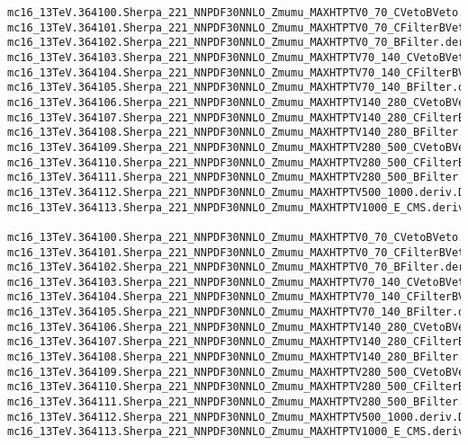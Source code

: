 \begin{tiny}
\begin{verbatim}
mc16_13TeV.364100.Sherpa_221_NNPDF30NNLO_Zmumu_MAXHTPTV0_70_CVetoBVeto.deriv.DAOD_STDM7.e5271_s3126_r9364_p4357
mc16_13TeV.364101.Sherpa_221_NNPDF30NNLO_Zmumu_MAXHTPTV0_70_CFilterBVeto.deriv.DAOD_STDM7.e5271_s3126_r9364_p4357
mc16_13TeV.364102.Sherpa_221_NNPDF30NNLO_Zmumu_MAXHTPTV0_70_BFilter.deriv.DAOD_STDM7.e5271_s3126_r9364_p4357
mc16_13TeV.364103.Sherpa_221_NNPDF30NNLO_Zmumu_MAXHTPTV70_140_CVetoBVeto.deriv.DAOD_STDM7.e5271_s3126_r9364_p4357
mc16_13TeV.364104.Sherpa_221_NNPDF30NNLO_Zmumu_MAXHTPTV70_140_CFilterBVeto.deriv.DAOD_STDM7.e5271_s3126_r9364_p4357
mc16_13TeV.364105.Sherpa_221_NNPDF30NNLO_Zmumu_MAXHTPTV70_140_BFilter.deriv.DAOD_STDM7.e5271_s3126_r9364_p4357
mc16_13TeV.364106.Sherpa_221_NNPDF30NNLO_Zmumu_MAXHTPTV140_280_CVetoBVeto.deriv.DAOD_STDM7.e5271_s3126_r9364_p4357
mc16_13TeV.364107.Sherpa_221_NNPDF30NNLO_Zmumu_MAXHTPTV140_280_CFilterBVeto.deriv.DAOD_STDM7.e5271_s3126_r9364_p4357
mc16_13TeV.364108.Sherpa_221_NNPDF30NNLO_Zmumu_MAXHTPTV140_280_BFilter.deriv.DAOD_STDM7.e5271_s3126_r9364_p4357
mc16_13TeV.364109.Sherpa_221_NNPDF30NNLO_Zmumu_MAXHTPTV280_500_CVetoBVeto.deriv.DAOD_STDM7.e5271_s3126_r9364_p4357
mc16_13TeV.364110.Sherpa_221_NNPDF30NNLO_Zmumu_MAXHTPTV280_500_CFilterBVeto.deriv.DAOD_STDM7.e5271_s3126_r9364_p4357
mc16_13TeV.364111.Sherpa_221_NNPDF30NNLO_Zmumu_MAXHTPTV280_500_BFilter.deriv.DAOD_STDM7.e5271_s3126_r9364_p4357
mc16_13TeV.364112.Sherpa_221_NNPDF30NNLO_Zmumu_MAXHTPTV500_1000.deriv.DAOD_STDM7.e5271_s3126_r9364_p4357
mc16_13TeV.364113.Sherpa_221_NNPDF30NNLO_Zmumu_MAXHTPTV1000_E_CMS.deriv.DAOD_STDM7.e5271_s3126_r9364_p4357

mc16_13TeV.364100.Sherpa_221_NNPDF30NNLO_Zmumu_MAXHTPTV0_70_CVetoBVeto.deriv.DAOD_STDM7.e5271_s3126_r10201_p4357
mc16_13TeV.364101.Sherpa_221_NNPDF30NNLO_Zmumu_MAXHTPTV0_70_CFilterBVeto.deriv.DAOD_STDM7.e5271_s3126_r10201_p4357
mc16_13TeV.364102.Sherpa_221_NNPDF30NNLO_Zmumu_MAXHTPTV0_70_BFilter.deriv.DAOD_STDM7.e5271_s3126_r10201_p4357
mc16_13TeV.364103.Sherpa_221_NNPDF30NNLO_Zmumu_MAXHTPTV70_140_CVetoBVeto.deriv.DAOD_STDM7.e5271_s3126_r10201_p4357
mc16_13TeV.364104.Sherpa_221_NNPDF30NNLO_Zmumu_MAXHTPTV70_140_CFilterBVeto.deriv.DAOD_STDM7.e5271_s3126_r10201_p4357
mc16_13TeV.364105.Sherpa_221_NNPDF30NNLO_Zmumu_MAXHTPTV70_140_BFilter.deriv.DAOD_STDM7.e5271_s3126_r10201_p4357
mc16_13TeV.364106.Sherpa_221_NNPDF30NNLO_Zmumu_MAXHTPTV140_280_CVetoBVeto.deriv.DAOD_STDM7.e5271_s3126_r10201_p4357
mc16_13TeV.364107.Sherpa_221_NNPDF30NNLO_Zmumu_MAXHTPTV140_280_CFilterBVeto.deriv.DAOD_STDM7.e5271_s3126_r10201_p4357
mc16_13TeV.364108.Sherpa_221_NNPDF30NNLO_Zmumu_MAXHTPTV140_280_BFilter.deriv.DAOD_STDM7.e5271_s3126_r10201_p4357
mc16_13TeV.364109.Sherpa_221_NNPDF30NNLO_Zmumu_MAXHTPTV280_500_CVetoBVeto.deriv.DAOD_STDM7.e5271_s3126_r10201_p4357
mc16_13TeV.364110.Sherpa_221_NNPDF30NNLO_Zmumu_MAXHTPTV280_500_CFilterBVeto.deriv.DAOD_STDM7.e5271_s3126_r10201_p4357
mc16_13TeV.364111.Sherpa_221_NNPDF30NNLO_Zmumu_MAXHTPTV280_500_BFilter.deriv.DAOD_STDM7.e5271_s3126_r10201_p4357
mc16_13TeV.364112.Sherpa_221_NNPDF30NNLO_Zmumu_MAXHTPTV500_1000.deriv.DAOD_STDM7.e5271_s3126_r10201_p4357
mc16_13TeV.364113.Sherpa_221_NNPDF30NNLO_Zmumu_MAXHTPTV1000_E_CMS.deriv.DAOD_STDM7.e5271_s3126_r10201_p4357


\end{verbatim}
\end{tiny}
